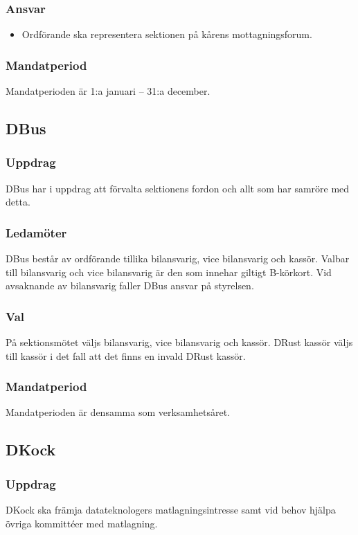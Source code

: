 \subsubsection{Ansvar}
\begin{itemize}
    \item Ordförande ska representera sektionen på kårens mottagningsforum.
\end{itemize}
\subsubsection{Mandatperiod}
Mandatperioden är 1:a januari – 31:a december.

\subsection{DBus}
\subsubsection{Uppdrag}
DBus har i uppdrag att förvalta sektionens fordon och allt som har samröre med detta.
\subsubsection{Ledamöter}
DBus består av ordförande tillika bilansvarig, vice bilansvarig och kassör. 
Valbar till bilansvarig och vice bilansvarig är den som innehar giltigt B-körkort. 
Vid avsaknande av bilansvarig faller DBus ansvar på styrelsen.
\subsubsection{Val}
På sektionsmötet väljs bilansvarig, vice bilansvarig och kassör. 
DRust kassör väljs till kassör i det fall att det finns en invald DRust kassör. 
\subsubsection{Mandatperiod}
Mandatperioden är densamma som verksamhetsåret.

\subsection{DKock}
\subsubsection{Uppdrag}
DKock ska främja datateknologers matlagningsintresse samt vid behov hjälpa övriga kommittéer med matlagning.
